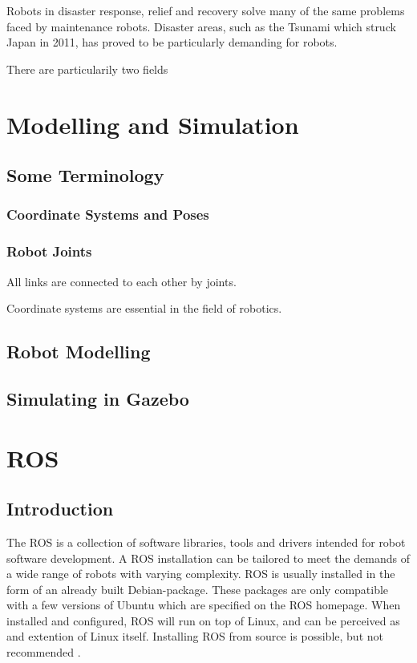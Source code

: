 Robots in disaster response, relief and recovery solve many of the same problems faced by maintenance robots. Disaster areas, such as the Tsunami which struck Japan in 2011, has proved to be particularly demanding for robots. 

There are particularily two fields \cite{subseaAIV}

\section{Modelling and Simulation}

\subsection{Some Terminology}

\subsubsection{Coordinate Systems and Poses}

\subsubsection{Robot Joints}

All links are connected to each other by joints. 

Coordinate systems are essential in the field of robotics. 

\subsection{Robot Modelling}

\subsection{Simulating in Gazebo}

\section{ROS}

\subsection{Introduction}

The \ac{ROS} is a collection of software libraries, tools and drivers intended for robot software development. A \ac{ROS} installation can be tailored to meet the demands of a wide range of robots with varying complexity. \ac{ROS} is usually installed in the form of an already built Debian-package. These packages are only compatible with a few versions of Ubuntu which are specified on the \ac{ROS} homepage. When installed and configured, \ac{ROS} will run on top of Linux, and can be perceived as and extention of Linux itself. Installing \ac{ROS} from source is possible, but not recommended \cite{ROS_install}.

